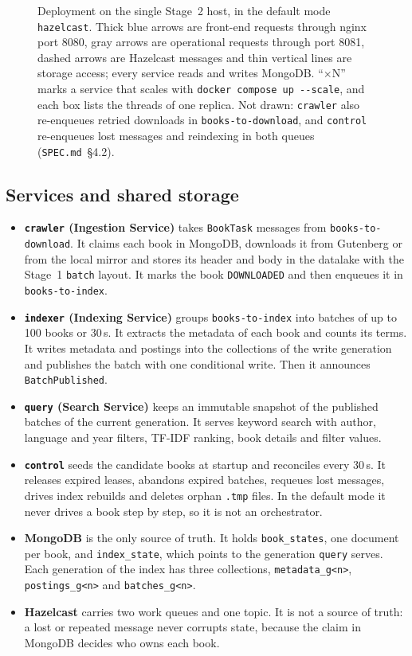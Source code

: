 \documentclass[11pt,a4paper]{article}
\newcommand{\code}[1]{\nolinkurl{#1}}
\newcommand{\mode}[1]{\code{#1}}
\newcommand{\spec}[1]{\code{SPEC.md}~\S#1}
\begin{document}
\begin{figure}[ht]
\begin{tikzpicture}
\end{tikzpicture}
\caption{Deployment on the single Stage~2 host, in the default mode \mode{hazelcast}. Thick blue arrows are front-end
requests through nginx port 8080, gray arrows are operational requests through port 8081, dashed arrows are Hazelcast
messages and thin vertical lines are storage access; every service reads and writes MongoDB. ``$\times$N'' marks a
service that scales with \texttt{docker compose up -{}-scale}, and each box lists the threads of one replica. Not
drawn: \code{crawler} also re-enqueues retried downloads in \code{books-to-download}, and \code{control} re-enqueues
lost messages and reindexing in both queues (\spec{4.2}).}
\label{fig:architecture}
\end{figure}

\subsection{Services and shared storage}

\begin{itemize}
\item \textbf{\code{crawler} (Ingestion Service)} takes \code{BookTask} messages from \code{books-to-download}. It claims
  each book in MongoDB, downloads it from Gutenberg or from the local mirror and stores its header and body in the
  datalake with the Stage~1 \code{batch} layout. It marks the book \code{DOWNLOADED} and then enqueues it in
  \code{books-to-index}.
\item \textbf{\code{indexer} (Indexing Service)} groups \code{books-to-index} into batches of up to 100 books or 30\,s.
  It extracts the metadata of each book and counts its terms. It writes metadata and postings into the collections of
  the write generation and publishes the batch with one conditional write. Then it announces \code{BatchPublished}.
\item \textbf{\code{query} (Search Service)} keeps an immutable snapshot of the published batches of the current
  generation. It serves keyword search with author, language and year filters, TF-IDF ranking, book details and filter
  values.
\item \textbf{\code{control}} seeds the candidate books at startup and reconciles every 30\,s. It releases expired
  leases, abandons expired batches, requeues lost messages, drives index rebuilds and deletes orphan \code{.tmp} files.
  In the default mode it never drives a book step by step, so it is not an orchestrator.
\item \textbf{MongoDB} is the only source of truth. It holds \code{book_states}, one document per book, and
  \code{index_state}, which points to the generation \code{query} serves. Each generation of the index has three
  collections, \code{metadata_g<n>}, \code{postings_g<n>} and \code{batches_g<n>}.
\item \textbf{Hazelcast} carries two work queues and one topic. It is not a source of truth: a lost or repeated message
  never corrupts state, because the claim in MongoDB decides who owns each book.
\end{itemize}
\end{document}
